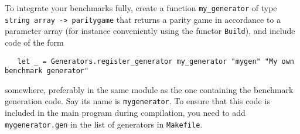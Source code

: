 To integrate your benchmarks fully, create a function \verb#my_generator# of type \verb#string array -> paritygame# that returns a 
parity game in accordance to a parameter array (for instance conveniently using the functor \verb#Build#), and include
code of the form
\begin{verbatim}
   let _ = Generators.register_generator my_generator "mygen" "My own benchmark generator"
\end{verbatim}
somewhere, preferably in the same module as the one containing the benchmark generation code. Say its name is \verb#mygenerator#.
To ensure that this code is included in the main program during compilation, you need to add \verb#mygenerator.gen# in the
list of generators in \verb#Makefile#.



